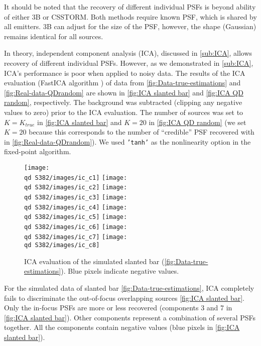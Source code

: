 It should be noted that the recovery of different individual PSFs is beyond ability of either 3B or CSSTORM. Both methods require known PSF, which is shared by all emitters. 3B can adjust for the size of the PSF, however, the shape (Gaussian)  remains identical for all sources. 

In theory, independent component analysis (ICA), discussed in \autoref{sub:ICA}, allows recovery of different individual PSFs. However, as we demonstrated in \autoref{sub:ICA}, ICA's performance is poor when applied to noisy data. The results of the ICA evaluation (FastICA algorithm \cite{Hyvarinen2000}) of data from \autoref{fig:Data-true-estimations} and \autoref{fig:Real-data-QDrandom} are shown in \autoref{fig:ICA slanted bar} and \autoref{fig:ICA QD random}, respectively. The background was subtracted (clipping any negative values to zero) prior to the ICA evaluation. The number of sources was set to $K=K_{true}$ in \autoref{fig:ICA slanted bar} and $K=20$ in \autoref{fig:ICA QD random} (we set $K=20$ because this corresponds to the number of ``credible'' PSF recovered with \inmf{} in \autoref{fig:Real-data-QDrandom}\bbb). We used {\tt 'tanh'} as the nonlinearity option in the fixed-point algorithm.

\begin{figure}[htb]
	\newcommand{\wf}{.22}
	\newcommand{\barspace}{-.6cm}	
	\centering
	\texttt{[image: \\qd S382/images/ic\_c1]}
	\texttt{[image: \\qd S382/images/ic\_c2]}
	\texttt{[image: \\qd S382/images/ic\_c3]}
	\texttt{[image: \\qd S382/images/ic\_c4]}
	\texttt{[image: \\qd S382/images/ic\_c5]}
	\texttt{[image: \\qd S382/images/ic\_c6]}
	\texttt{[image: \\qd S382/images/ic\_c7]}
	\texttt{[image: \\qd S382/images/ic\_c8]}
	\caption{ICA evaluation of the simulated slanted bar (\autoref{fig:Data-true-estimations}). Blue pixels indicate negative values.}
	\label{fig:ICA slanted bar}
\end{figure}
%
For the simulated data of slanted bar \autoref{fig:Data-true-estimations}\aaa, ICA completely fails to discriminate the out-of-focus overlapping sources \autoref{fig:ICA slanted bar}. Only the in-focus PSFs are more or less recovered (components 3 and 7 in \autoref{fig:ICA slanted bar}). Other components represent  a combination of several PSFs together. All the components contain negative values (blue pixels in \autoref{fig:ICA slanted bar}).

